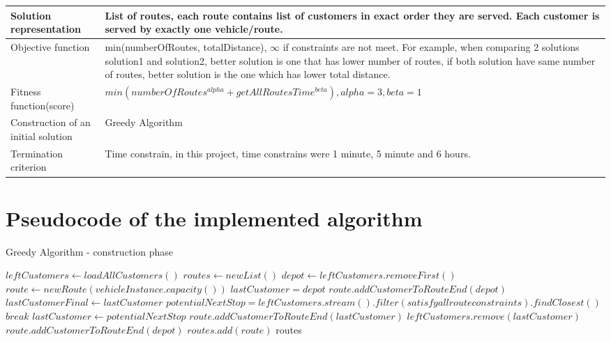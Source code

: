 \documentclass{article}
\begin{document}
\begin{center}
\begin{tabular}{ | m{15em} | m{30em} | }  
  \hline
  Solution representation & List of routes, each route contains list of customers in exact order they are served. Each customer is served by exactly one vehicle/route. \\ 
  \hline
  Objective function & min(numberOfRoutes, totalDistance), $ \infty $  if constraints are not meet. For example, when comparing 2 solutions solution1 and solution2, better solution is one that has lower number of routes, if both solution have same number of routes, better solution is the one which has lower total distance. \\
  \hline
  Fitness function(score) & $ min(numberOfRoutes^{alpha} + getAllRoutesTime^{beta}), alpha = 3, beta = 1 $ \\ 
  \hline
  Construction of an initial solution & Greedy Algorithm \\ 
  \hline
  Termination criterion & Time constrain, in this project, time constrains were 1 minute, 5 minute and 6 hours. \\ 
  \hline
\end{tabular}
\end{center}

\clearpage

\section{Pseudocode of the implemented algorithm}

\begin{algorithm}
\caption{Greedy Algorithm - construction phase}
    \begin{algorithmic} 
    \STATE $leftCustomers \leftarrow loadAllCustomers()$
    \STATE $routes \leftarrow new List()$
    \STATE $depot \leftarrow leftCustomers.removeFirst()$
        \STATE $route \leftarrow new Route(vehicleInstance.capacity())$
        \STATE $lastCustomer = depot$
        \STATE $route.addCustomerToRouteEnd(depot)$
            \STATE $lastCustomerFinal \leftarrow lastCustomer$
            \STATE $potentialNextStop = leftCustomers.stream().filter(satisfy all route constraints).findClosest()$
                \STATE $break$
            \ENDIF
            \STATE $lastCustomer \leftarrow potentialNextStop$
            \STATE $route.addCustomerToRouteEnd(lastCustomer)$
            \STATE $leftCustomers.remove(lastCustomer)$
        \ENDWHILE
        \STATE $route.addCustomerToRouteEnd(depot)$
        \STATE $routes.add(route)$
    \ENDWHILE
    \RETURN routes
\end{algorithmic}
\end{algorithm}
\end{document}
